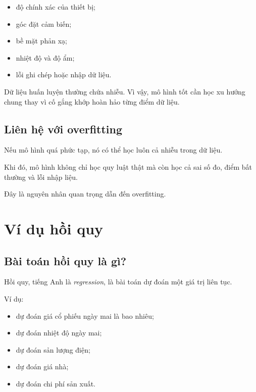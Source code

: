\documentclass[12pt,a4paper]{report}
\begin{document}
\begin{itemize}
    \item độ chính xác của thiết bị;
    \item góc đặt cảm biến;
    \item bề mặt phản xạ;
    \item nhiệt độ và độ ẩm;
    \item lỗi ghi chép hoặc nhập dữ liệu.
\end{itemize}

\begin{ghinho}
Dữ liệu huấn luyện thường chứa nhiễu. Vì vậy, mô hình tốt cần học xu hướng chung thay vì cố gắng khớp hoàn hảo từng điểm dữ liệu.
\end{ghinho}

\section{Liên hệ với overfitting}

Nếu mô hình quá phức tạp, nó có thể học luôn cả nhiễu trong dữ liệu.

Khi đó, mô hình không chỉ học quy luật thật mà còn học cả sai số đo, điểm bất thường và lỗi nhập liệu.

Đây là nguyên nhân quan trọng dẫn đến overfitting.

\chapter{Ví dụ hồi quy}

\section{Bài toán hồi quy là gì?}

Hồi quy, tiếng Anh là \textit{regression}, là bài toán dự đoán một giá trị liên tục.

Ví dụ:

\begin{itemize}
    \item dự đoán giá cổ phiếu ngày mai là bao nhiêu;
    \item dự đoán nhiệt độ ngày mai;
    \item dự đoán sản lượng điện;
    \item dự đoán giá nhà;
    \item dự đoán chi phí sản xuất.
\end{itemize}
\end{document}
